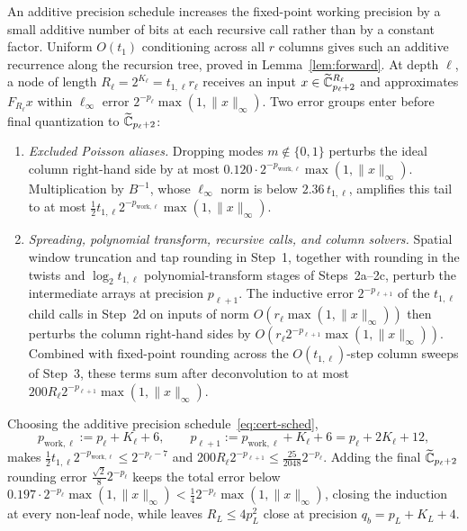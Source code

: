 An additive precision schedule increases the fixed-point working precision by a small additive number of bits at each recursive call rather than by a constant factor. Uniform $O(t_1)$ conditioning across all $r$ columns gives such an additive recurrence along the recursion tree, proved in Lemma~\ref{lem:forward}. At depth $\ell$, a node of length $R_\ell = 2^{K_\ell} = t_{1,\ell} r_\ell$ receives an input $x \in \widetilde{\mathbb{C}}_{p_\ell+2}^{R_\ell}$ and approximates $F_{R_\ell} x$ within $\ell_\infty$ error $2^{-p_\ell} \max(1, \|x\|_\infty)$. Two error groups enter before final quantization to $\widetilde{\mathbb{C}}_{p_\ell+2}$:
\begin{enumerate}[label=(\arabic*),leftmargin=*,itemsep=2pt,parsep=0pt,topsep=3pt]
  \item \emph{Excluded Poisson aliases.} Dropping modes $m \notin \{0, 1\}$ perturbs the ideal column right-hand side by at most $0.120 \cdot 2^{-p_{\mathrm{work},\ell}} \max(1, \|x\|_\infty)$. Multiplication by $B^{-1}$, whose $\ell_\infty$ norm is below $2.36\, t_{1,\ell}$, amplifies this tail to at most $\frac{1}{2} t_{1,\ell} 2^{-p_{\mathrm{work},\ell}} \max(1, \|x\|_\infty)$.

  \item \emph{Spreading, polynomial transform, recursive calls, and column solvers.} Spatial window truncation and tap rounding in Step~1, together with rounding in the twists and $\log_2 t_{1,\ell}$ polynomial-transform stages of Steps~2a--2c, perturb the intermediate arrays at precision $p_{\ell+1}$. The inductive error $2^{-p_{\ell+1}}$ of the $t_{1,\ell}$ child calls in Step~2d on inputs of norm $O(r_\ell \max(1, \|x\|_\infty))$ then perturbs the column right-hand sides by $O(r_\ell 2^{-p_{\ell+1}} \max(1, \|x\|_\infty))$. Combined with fixed-point rounding across the $O(t_{1,\ell})$-step column sweeps of Step~3, these terms sum after deconvolution to at most $200 R_\ell 2^{-p_{\ell+1}} \max(1, \|x\|_\infty)$.
\end{enumerate}

Choosing the additive precision schedule~\eqref{eq:cert-sched},
\[
  p_{\mathrm{work},\ell} := p_\ell + K_\ell + 6, \qquad
  p_{\ell+1} := p_{\mathrm{work},\ell} + K_\ell + 6 = p_\ell + 2 K_\ell + 12,
\]
makes $\frac{1}{2} t_{1,\ell} 2^{-p_{\mathrm{work},\ell}} \le 2^{-p_\ell - 7}$ and $200 R_\ell 2^{-p_{\ell+1}} \le \frac{25}{2048} 2^{-p_\ell}$. Adding the final $\widetilde{\mathbb{C}}_{p_\ell+2}$ rounding error $\frac{\sqrt{2}}{8} 2^{-p_\ell}$ keeps the total error below $0.197 \cdot 2^{-p_\ell} \max(1, \|x\|_\infty) < \frac{1}{4} 2^{-p_\ell} \max(1, \|x\|_\infty)$, closing the induction at every non-leaf node, while leaves $R_L \le 4 p_L^2$ close at precision $q_b = p_L + K_L + 4$.

